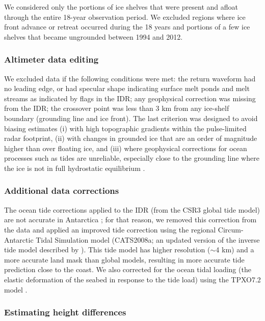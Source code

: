 We considered only the portions of ice shelves that were present and afloat through the entire 18-year observation period. We excluded regions where ice front advance or retreat occurred during the 18 years and portions of a few ice shelves that became ungrounded between 1994 and 2012.

\subsubsection{Altimeter data editing}

\noindent
We excluded data if the following conditions were met: the return waveform had no leading edge, or had specular shape indicating surface melt ponds and melt streams \parencite{Phillips1998} as indicated by flags in the IDR; any geophysical correction was missing from the IDR; the crossover point was less than 3 km from any ice-shelf boundary (grounding line and ice front). The last criterion was designed to avoid biasing estimates (i) with high topographic gradients within the pulse-limited radar footprint, (ii) with changes in grounded ice that are an order of magnitude higher than over floating ice, and (iii) where geophysical corrections for ocean processes such as tides are unreliable, especially close to the grounding line where the ice is not in full hydrostatic equilibrium \parencite{Fricker2006}.


\subsubsection{Additional data corrections}

\noindent
The ocean tide corrections applied to the IDR (from the CSR3 global tide model) are not accurate in Antarctica \parencite{King2005}; for that reason, we removed this correction from the data and applied an improved tide correction using the regional Circum-Antarctic Tidal Simulation model (CATS2008a; an updated version of the inverse tide model described by \textcite{Padman2002}). This tide model has higher resolution ($\sim$4 km) and a more accurate land mask than global models, resulting in more accurate tide prediction close to the coast. We also corrected for the ocean tidal loading (the elastic deformation of the seabed in response to the tide load) using the TPXO7.2 model \parencite{Egbert2002}.

\subsubsection{Estimating height differences}

